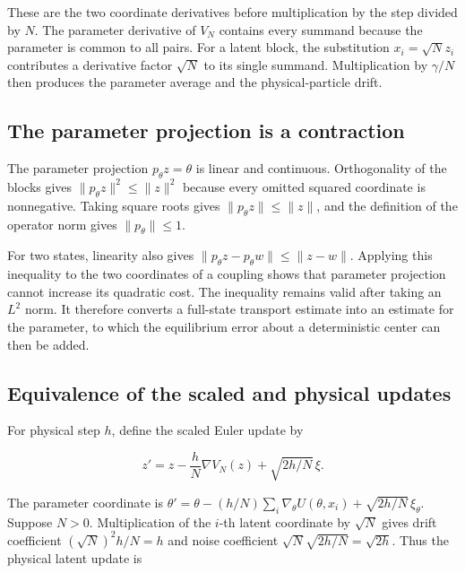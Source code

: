 \documentclass[11pt,a4paper]{article}
\begin{document}
These are the two coordinate derivatives before multiplication by the step divided by \(N\). The parameter derivative of \(V_N\) contains every summand because the parameter is common to all pairs. For a latent block, the substitution \(x_i=\sqrt N z_i\) contributes a derivative factor \(\sqrt N\) to its single summand. Multiplication by \(\gamma/N\) then produces the parameter average and the physical-particle drift.



\subsection{\texorpdfstring{The parameter projection is a contraction}{The parameter projection is a contraction}}


The parameter projection \(p_\theta z=\theta\) is linear and continuous. Orthogonality of the blocks gives \(\|p_\theta z\|^2\le\|z\|^2\) because every omitted squared coordinate is nonnegative. Taking square roots gives \(\|p_\theta z\|\le\|z\|\), and the definition of the operator norm gives \(\|p_\theta\|\le1\).



For two states, linearity also gives \(\|p_\theta z-p_\theta w\|\le\|z-w\|\). Applying this inequality to the two coordinates of a coupling shows that parameter projection cannot increase its quadratic cost. The inequality remains valid after taking an \(L^2\) norm. It therefore converts a full-state transport estimate into an estimate for the parameter, to which the equilibrium error about a deterministic center can then be added.



\subsection{\texorpdfstring{Equivalence of the scaled and physical updates}{Equivalence of the scaled and physical updates}}


For physical step \(h\), define the scaled Euler update by

\[z'=z-\frac hN\nabla V_N(z)+\sqrt{2h/N}\,\xi.\]

The parameter coordinate is \(\theta'=\theta-(h/N)\sum_i\nabla_\theta U(\theta,x_i)+\sqrt{2h/N}\,\xi_\theta\). Suppose \(N>0\). Multiplication of the \(i\)-th latent coordinate by \(\sqrt N\) gives drift coefficient \((\sqrt N)^2h/N=h\) and noise coefficient \(\sqrt N\sqrt{2h/N}=\sqrt{2h}\). Thus the physical latent update is
\end{document}
